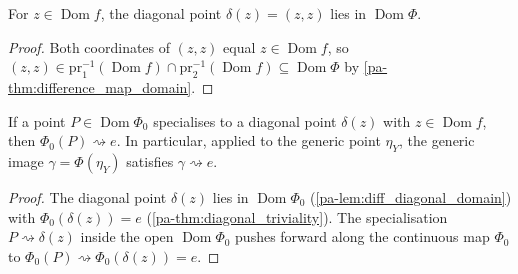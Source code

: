 \begin{lemma}
  \label{pa-lem:diff_diagonal_domain}
  \leanok

  For \(z \in \operatorname{Dom} f\), the diagonal point \(\delta(z) = (z, z)\)
  lies in \(\operatorname{Dom}\Phi\).
\end{lemma}
\begin{proof}
  \leanok
  Both coordinates of \((z, z)\) equal \(z \in \operatorname{Dom} f\), so
  \((z, z) \in \mathrm{pr}_1^{-1}(\operatorname{Dom} f) \cap
  \mathrm{pr}_2^{-1}(\operatorname{Dom} f) \subseteq \operatorname{Dom}\Phi\) by
  \ref{pa-thm:difference_map_domain}.
\end{proof}

\begin{theorem}
  \label{pa-thm:generic_image_specializes_unit}
  \leanok

  If a point \(P \in \operatorname{Dom}\Phi_0\) specialises to a diagonal point
  \(\delta(z)\) with \(z \in \operatorname{Dom} f\), then \(\Phi_0(P)
  \rightsquigarrow e\). In particular, applied to the generic point \(\eta_Y\),
  the generic image \(\gamma = \Phi(\eta_Y)\) satisfies \(\gamma
  \rightsquigarrow e\).
\end{theorem}
\begin{proof}
  \leanok
  The diagonal point \(\delta(z)\) lies in \(\operatorname{Dom}\Phi_0\)
  (\ref{pa-lem:diff_diagonal_domain}) with \(\Phi_0(\delta(z)) = e\)
  (\ref{pa-thm:diagonal_triviality}). The specialisation \(P \rightsquigarrow
  \delta(z)\) inside the open \(\operatorname{Dom}\Phi_0\) pushes forward along
  the continuous map \(\Phi_0\) to \(\Phi_0(P) \rightsquigarrow
  \Phi_0(\delta(z)) = e\).
\end{proof}

